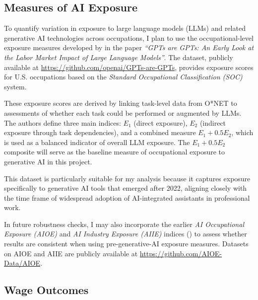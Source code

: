 \documentclass[12pt]{article}
\begin{document}
\subsection{Measures of AI Exposure}

To quantify variation in exposure to large language models (LLMs) and related generative AI technologies across occupations, I plan to use the occupational-level exposure measures developed by \cite{eloundou2024gpts} in the paper \textit{``GPTs are GPTs: An Early Look at the Labor Market Impact of Large Language Models''}. The dataset, publicly available at \href{https://github.com/openai/GPTs-are-GPTs/tree/main/data}{https://github.com/openai/GPTs-are-GPTs}, provides exposure scores for U.S. occupations based on the \textit{Standard Occupational Classification (SOC)} system.  

These exposure scores are derived by linking task-level data from O*NET to assessments of whether each task could be performed or augmented by LLMs. The authors define three main indices: \(E_1\) (direct exposure), \(E_2\) (indirect exposure through task dependencies), and a combined measure \(E_1 + 0.5E_2\), which is used as a balanced indicator of overall LLM exposure. The \(E_1 + 0.5E_2\) composite will serve as the baseline measure of occupational exposure to generative AI in this project.  

This dataset is particularly suitable for my analysis because it captures exposure specifically to generative AI tools that emerged after 2022, aligning closely with the time frame of widespread adoption of AI-integrated assistants in professional work.

In future robustness checks, I may also incorporate the earlier \textit{AI Occupational Exposure (AIOE)} and \textit{AI Industry Exposure (AIIE)} indices (\cite{felten2021aioe}) to assess whether results are consistent when using pre-generative-AI exposure measures. Datasets on AIOE and AIIE are publicly available at \href{https://github.com/AIOE-Data/AIOE}{https://github.com/AIOE-Data/AIOE}.
\subsection{Wage Outcomes}
  
\end{document}

